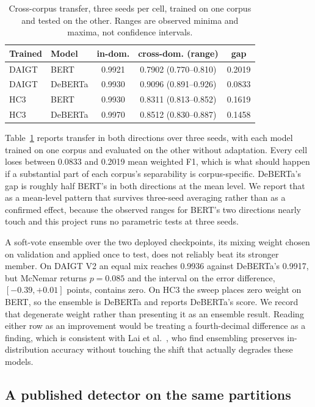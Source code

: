 \begin{table}[!ht]
\centering
\caption{Cross-corpus transfer, three seeds per cell, trained on one corpus and tested on the other. Ranges are observed minima and maxima, not confidence intervals.}
\label{tab:cross}
\footnotesize
\setlength{\tabcolsep}{3.5pt}
\begin{tabular}{@{}llccc@{}}
\toprule
Trained & Model & in-dom. & cross-dom. (range) & gap \\
\midrule
DAIGT & BERT & 0.9921 & 0.7902 (0.770--0.810) & 0.2019 \\
DAIGT & DeBERTa & 0.9930 & 0.9096 (0.891--0.926) & 0.0833 \\
HC3 & BERT & 0.9930 & 0.8311 (0.813--0.852) & 0.1619 \\
HC3 & DeBERTa & 0.9970 & 0.8512 (0.830--0.887) & 0.1458 \\
\bottomrule
\end{tabular}
\end{table}

Table~\ref{tab:cross} reports transfer in both directions over three seeds, with each model trained on one corpus and evaluated on the other without adaptation. Every cell loses between 0.0833 and 0.2019 mean weighted F1, which is what should happen if a substantial part of each corpus's separability is corpus-specific. DeBERTa's gap is roughly half BERT's in both directions at the mean level. We report that as a mean-level pattern that survives three-seed averaging rather than as a confirmed effect, because the observed ranges for BERT's two directions nearly touch and this project runs no parametric tests at three seeds.

A soft-vote ensemble over the two deployed checkpoints, its mixing weight chosen on validation and applied once to test, does not reliably beat its stronger member. On DAIGT V2 an equal mix reaches 0.9936 against DeBERTa's 0.9917, but McNemar returns $p=0.085$ and the interval on the error difference, $[-0.39, +0.01]$ points, contains zero. On HC3 the sweep places zero weight on BERT, so the ensemble is DeBERTa and reports DeBERTa's score. We record that degenerate weight rather than presenting it as an ensemble result. Reading either row as an improvement would be treating a fourth-decimal difference as a finding, which is consistent with Lai et al.~\cite{Lai2024adaptive}, who find ensembling preserves in-distribution accuracy without touching the shift that actually degrades these models.

\subsection{A published detector on the same partitions}
\label{sec:published}

